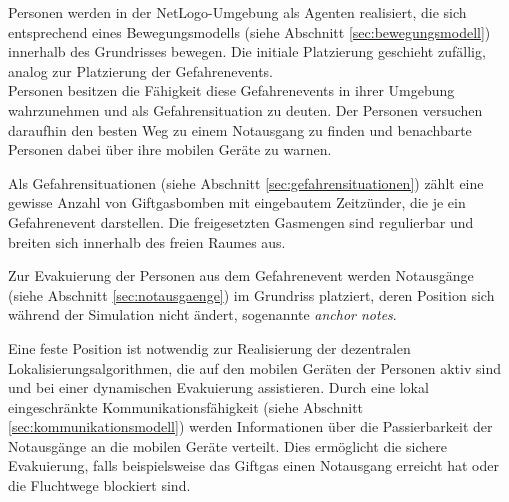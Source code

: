Personen werden in der NetLogo-Umgebung als Agenten realisiert, die sich entsprechend eines Bewegungsmodells (siehe Abschnitt \ref{sec:bewegungsmodell}) innerhalb des Grundrisses bewegen. Die initiale Platzierung geschieht zufällig, analog zur Platzierung der Gefahrenevents.\\
Personen besitzen die Fähigkeit diese Gefahrenevents in ihrer Umgebung wahrzunehmen und als Gefahrensituation zu deuten. Der Personen versuchen daraufhin den besten Weg zu einem Notausgang zu finden und benachbarte Personen dabei über ihre mobilen Geräte zu warnen.

Als Gefahrensituationen (siehe Abschnitt \ref{sec:gefahrensituationen}) zählt eine gewisse Anzahl von Giftgasbomben mit eingebautem Zeitzünder, die je ein Gefahrenevent darstellen. Die freigesetzten Gasmengen sind regulierbar und breiten sich innerhalb des freien Raumes aus.

Zur Evakuierung der Personen aus dem Gefahrenevent werden Notausgänge (siehe Abschnitt \ref{sec:notausgaenge}) im Grundriss platziert, deren Position sich während der Simulation nicht ändert, sogenannte \emph{anchor notes}.

Eine feste Position ist notwendig zur Realisierung der dezentralen Lokalisierungsalgorithmen, die auf den mobilen Geräten der Personen aktiv sind und bei einer dynamischen Evakuierung assistieren. Durch eine lokal eingeschränkte Kommunikationsfähigkeit (siehe Abschnitt \ref{sec:kommunikationsmodell}) werden Informationen über die Passierbarkeit der Notausgänge an die mobilen Geräte verteilt. Dies ermöglicht die sichere Evakuierung, falls beispielsweise das Giftgas einen Notausgang erreicht hat oder die Fluchtwege blockiert sind.

